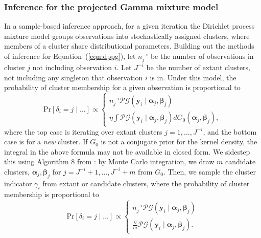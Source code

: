 \subsubsection{Inference for the projected Gamma mixture model}
In a sample-based inference approach, for a given iteration the Dirichlet process mixture model groups observations
    into stochastically assigned clusters, where members of a cluster share distributional parameters. Building out 
    the methods of inference for Equation~(\ref{eqn:dppg}), 
    let $n_j^{-i}$ be the number of observations in cluster $j$ not including observation $i$.  Let $J^{-i}$ be 
    the number of extant clusters, not including any singleton that observation $i$ is in. Under this model, 
    the probability of cluster membership for a given observation is proportional to
\begin{equation*}
    \text{Pr}\left[\delta_i = j\mid\ldots\right] \propto \begin{cases}
        n_j^{-i}\mathcal{PG}\left(\bm{y}_i\mid\bm{\alpha}_j,\bm{\beta}_j\right)\\ %
        \eta\int\mathcal{PG}\left(\bm{y}_i\mid\bm{\alpha}_j,\bm{\beta}_j\right)dG_0(\bm{\alpha}_j,\bm{\beta}_j),%
        \end{cases}
\end{equation*}
where the top case is iterating over extant clusters $j = 1,\ldots, J^{-i}$, and the bottom case is
    for a \emph{new} cluster. If $G_0$ is not a conjugate prior for the kernel density, the integral in the 
    above formula may not be available in closed form. We sidestep this using Algorithm 8 from \cite{neal2000}: 
    by Monte Carlo integration, we draw $m$ candidate clusters, $\bm{\alpha}_j,\bm{\beta}_j$ for
    $j = J^{-i} + 1,\ldots, J^{-i} + m$ from $G_0$. Then, we sample the cluster indicator 
    $\gamma_i$ from extant or candidate clusters, where the probability of cluster membership is proportional to
\begin{equation}
    \text{Pr}\left[\delta_i = j\mid\ldots\right] \propto \begin{cases}
        n_j^{-i}\mathcal{PG}\left(\bm{y}_i\mid\bm{\alpha}_j,\bm{\beta}_j\right)\\ %
        \frac{\eta}{m}\mathcal{PG}\left(\bm{y}_i\mid\bm{\alpha}_j,\bm{\beta}_j\right). %
        \end{cases}
\end{equation}
